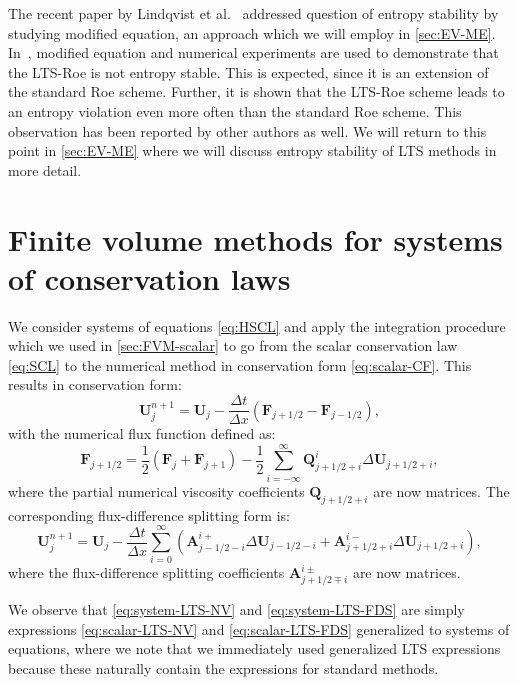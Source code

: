 The recent paper by Lindqvist et al.~\cite{lin16} addressed question of entropy stability by studying modified equation, an approach which we will employ in \cref{sec:EV-ME}. In~\cite{lin16}, modified equation and numerical experiments are used to demonstrate that the LTS-Roe is not entropy stable. This is expected, since it is an extension of the standard Roe scheme. Further, it is shown that the LTS-Roe scheme leads to an entropy violation even more often than the standard Roe scheme. This observation has been reported by other authors as well. We will return to this point in \cref{sec:EV-ME} where we will discuss entropy stability of LTS methods in more detail. 

\section{Finite volume methods for systems of conservation laws}
\label{sec:Background:FVM-systems}

We consider systems of equations \eqref{eq:HSCL} and apply the integration procedure which we used in \cref{sec:FVM-scalar} to go from the scalar conservation law \eqref{eq:SCL} to the numerical method in conservation form \eqref{eq:scalar-CF}. This results in conservation form:
\begin{equation} \label{eq:system-CF}
\mathbf{U}_j^{n+1} = \mathbf{U}_j - \frac{\Delta t}{\Delta x} \left( \mathbf{F}_{j+1/2} - \mathbf{F}_{j-1/2} \right),
\end{equation}
with the numerical flux function defined as:
\begin{equation} \label{eq:system-LTS-NV}
\mathbf{F}_{j+1/2} = \frac{1}{2} \left( \mathbf{F}_j + \mathbf{F}_{j+1} \right) - \frac{1}{2} \sum\limits_{i=-\infty}^{\infty} \mathbf{Q}_{j+1/2+i}^i \Delta \mathbf{U}_{j+1/2+i},
\end{equation}
where the partial numerical viscosity coefficients $ \mathbf{Q}_{j+1/2+i} $ are now matrices. The corresponding flux-difference splitting form is:
\begin{equation} \label{eq:system-LTS-FDS}
\mathbf{U}_j^{n+1} = \mathbf{U}_j - \frac{\Delta t}{\Delta x} \sum\limits_{i=0}^{\infty} \left( \mathbf{A}_{j-1/2-i}^{i+} \Delta \mathbf{U}_{j-1/2-i} + \mathbf{A}_{j+1/2+i}^{i-} \Delta \mathbf{U}_{j+1/2+i} \right),
\end{equation}
where the flux-difference splitting coefficients $ \mathbf{A}_{j+1/2\mp i}^{i\pm} $ are now matrices. 

We observe that \eqref{eq:system-LTS-NV} and \eqref{eq:system-LTS-FDS} are simply expressions \eqref{eq:scalar-LTS-NV} and \eqref{eq:scalar-LTS-FDS} generalized to systems of equations, where we note that we immediately used generalized LTS expressions because these naturally contain the expressions for standard methods.

